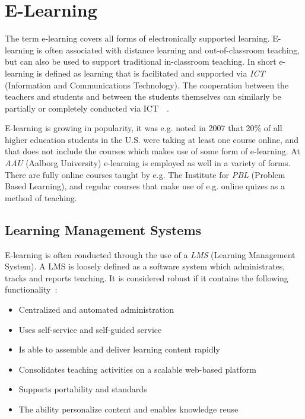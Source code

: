 \section{E-Learning}\label{sec:e-learning}
The term e-learning covers all forms of electronically supported learning. E-learning is often associated with distance learning and out-of-classroom teaching, but can also be used to support traditional in-classroom teaching. In short e-learning is defined as learning that is facilitated and supported via \emph{ICT} (Information and Communications Technology). The cooperation between the teachers and students and between the students themselves can similarly be partially or completely conducted via ICT~\citep{def_e-learning1}~\citep{def_e-learning2}.

E-learning is growing in popularity, it was e.g. noted in 2007 that 20\% of all higher education students in the U.S. were taking at least one course online, and that does not include the courses which makes use of some form of e-learning.	At \emph{AAU} (Aalborg University) e-learning is employed as well in a variety of forms. There are fully online courses taught by e.g. The Institute for \emph{PBL} (Problem Based Learning)\cite{mpbl}, and regular courses that make use of e.g. online quizes as a method of teaching. 

\subsection{Learning Management Systems}
E-learning is often conducted through the use of a \emph{LMS} (Learning Management System). A LMS is loosely defined as a software system which administrates, tracks and reports teaching. It is considered robust if it contains the following functionality~\citep{Ellis09}:

\begin{itemize}
	\item Centralized and automated administration
	\item Uses self-service and self-guided service
	\item Is able to assemble and deliver learning content rapidly
	\item Consolidates teaching activities on a scalable web-based platform
	\item Supports portability and standards
	\item The ability personalize content and enables knowledge reuse
\end{itemize}

